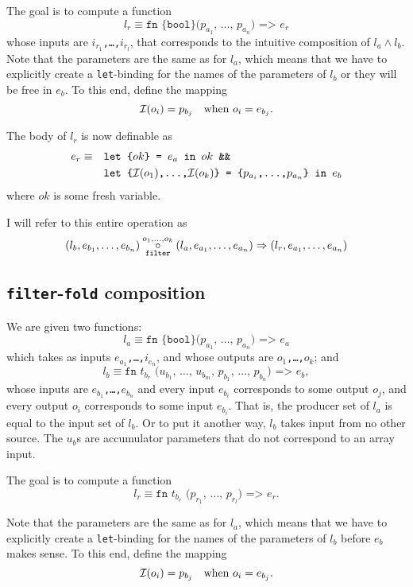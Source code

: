 The goal is to compute a function
\[
l_{r} \equiv \texttt{fn \{bool\} ($p_{a_{1}}$, \ldots, $p_{a_{n}}$)
=> $e_{r}$}
\]
whose inputs are \texttt{$i_{r_{1}}$,\ldots,$i_{r_{l}}$}, that
corresponds to the intuitive composition of $l_{a} \wedge l_{b}$.
Note that the parameters are the same as for $l_{a}$, which means that
we have to explicitly create a \texttt{let}-binding for the names of
the parameters of $l_{b}$ or they will be free in $e_{b}$.  To this end,
define the mapping
\[
\mathcal{I}(o_{i}) = p_{b_{j}} \quad \textrm{when $o_{i} = e_{b_{j}}$}.
\]

The body of $l_{r}$ is now definable as
\begin{align*}
e_{r} \equiv\quad&\texttt{let \{$ok$\} = $e_{a}$ in $ok$ \&\&} \\
& \texttt{let \{$\mathcal{I}(o_{1})$,\ldots,$\mathcal{I}(o_{k})$\} = \{$p_{a_{i}}$,\ldots,$p_{a_{n}}$\} in $e_{b}$}
\end{align*}
where $ok$ is some fresh variable.

I will refer to this entire operation as
\[
(l_{b},e_{b_{1}},\ldots,e_{b_{n}}) \underset{\texttt{filter}}{\overset{o_{1},\ldots,o_{k}}\circ}(l_{a},e_{a_{1}},\ldots,e_{a_{n}}) \Rightarrow (l_{r},e_{a_{1}},\ldots,e_{a_{n}})
\]

\subsection{\texttt{filter}-\texttt{fold} composition}

We are given two functions:
\[
l_{a}\equiv\texttt{fn \{bool\} ($p_{a_{1}}$, \ldots, $p_{a_{n}}$) => $e_{a}$}
\]
which takes as inputs \texttt{$e_{a_{1}}$,\ldots,$i_{e_{n}}$}, and whose
outputs are \texttt{$o_1$,\ldots,$o_k$}; and
\[
l_{b}\equiv\texttt{fn $t_{b_{r}}$ ($u_{b_{1}}$, \ldots, $u_{b_{m}}$, $p_{b_{1}}$, \ldots, $p_{b_{n}}$) => $e_{b}$},
\]
whose inputs are \texttt{$e_{b_{1}}$,\ldots,$e_{b_{n}}$} and every
input $e_{b_{i}}$ corresponds to some output $o_{j}$, and every output
$o_{i}$ corresponds to some input $e_{b_{i}}$.  That is, the producer
set of $l_{a}$ is equal to the input set of $l_{b}$.  Or to put it
another way, $l_{b}$ takes input from no other source.  The $u_{b}$s
are accumulator parameters that do not correspond to an array input.

The goal is to compute a function
\[
l_{r} \equiv \texttt{fn $t_{b_{r}}$ ($p_{r_{1}}$, \ldots, $p_{r_{l}}$)
=> $e_{r}$}.
\]

Note that the parameters are the same as for $l_{a}$, which means that
we have to explicitly create a \texttt{let}-binding for the names of
the parameters of $l_{b}$ before $e_{b}$ makes sense.  To this end,
define the mapping
\[
\mathcal{I}(o_{i}) = p_{b_{j}} \quad \textrm{when $o_{i} = e_{b_{j}}$}.
\]

